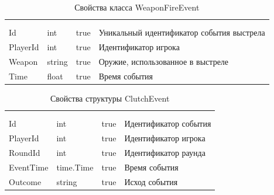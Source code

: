 \begin{xltabular}{\textwidth}{|X|X|X|X|}
	\caption{Свойства класса WeaponFireEvent}\label{table:WeaponFireEvent}\\ \hline
	 &  &  &  \\ \hline
	 &  &  &  \\ \hline
	\endfirsthead
	 \hline
	 &  &  &  \\ \hline
	\endhead
	Id & int & true & Уникальный идентификатор события выстрела \\ \hline
	PlayerId & int & true & Идентификатор игрока \\ \hline
	Weapon & string & true & Оружие, использованное в выстреле \\ \hline
	Time & float & true & Время события \\ \hline
\end{xltabular}

\begin{xltabular}{\textwidth}{|X|X|X|X|}
	\caption{Свойства структуры ClutchEvent}\label{table:ClutchEvent}\\ \hline
	 &  &  &  \\ \hline
	 &  &  &  \\ \hline
	\endfirsthead
	 \hline
	 &  &  &  \\ \hline
	\endhead
	Id & int & true & Идентификатор события \\ \hline
	PlayerId & int & true & Идентификатор игрока \\ \hline
	RoundId & int & true & Идентификатор раунда \\ \hline
	EventTime & time.Time & true & Время события \\ \hline
	Outcome & string & true & Исход события \\ \hline
\end{xltabular}

